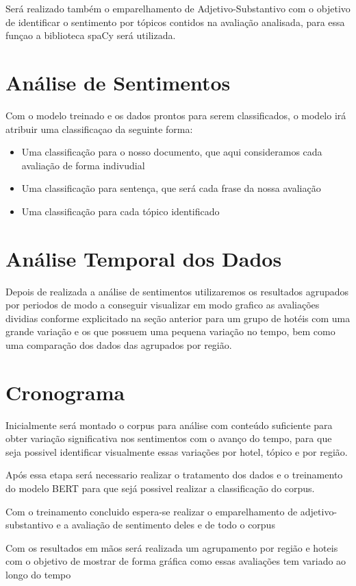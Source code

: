 Será realizado também o emparelhamento de Adjetivo-Substantivo com o objetivo de identificar o sentimento por tópicos contidos na avaliação analisada, para essa funçao a biblioteca spaCy \cite{montani2022spacy} será utilizada. 

\section{Análise de Sentimentos}


Com o modelo treinado e os dados prontos para serem classificados, o modelo irá atribuir uma classificaçao da seguinte forma:
\begin{itemize}
    \item Uma classificação para o nosso documento, que aqui consideramos cada avaliação de forma indivudial
    \item Uma classificação para sentença, que será cada frase da nossa avaliação
    \item Uma classificação para cada tópico identificado
\end{itemize}

\section{Análise Temporal dos Dados}

Depois de realizada a análise de sentimentos utilizaremos os resultados agrupados por periodos de modo a conseguir visualizar em modo grafico as avaliações dividias conforme explicitado na seção anterior para um grupo de hotéis com uma grande variação e os que possuem uma pequena variação no tempo, bem como uma comparação dos dados das agrupados por região.  

\section{Cronograma}

Inicialmente será montado o corpus para análise com conteúdo suficiente para obter variação significativa nos sentimentos com o avanço do tempo, para que seja possivel identificar visualmente essas variações por hotel, tópico e por região.

Após essa etapa será necessario realizar o tratamento dos dados e o treinamento do modelo BERT para que sejá possivel realizar a classificação do corpus.

Com o treinamento concluido espera-se realizar o emparelhamento de adjetivo-substantivo e a avaliação de sentimento deles e de todo o corpus

Com os resultados em mãos será realizada um agrupamento por região e hoteis com o objetivo de mostrar de forma gráfica como essas avaliações tem variado ao longo do tempo
